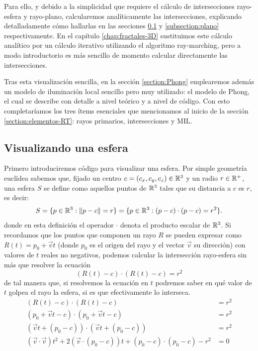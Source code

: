 Para ello, y debido a la simplicidad que requiere el cálculo de intersecciones rayo-esfera y rayo-plano, calcularemos analíticamente las intersecciones, explicando detalladamente cómo hallarlas en las secciones \ref{subsection:esfera} y \ref{subsection:plano} respectivamente. En el capítulo \ref{chap:fractales-3D} sustituimos este cálculo analítico por un cálculo iterativo utilizando el algoritmo ray-marching, pero a modo introductorio es más sencillo de momento calcular directamente las intersecciones.

Tras esta visualización sencilla, en la sección \ref{section:Phong} emplearemos además un modelo de iluminación local sencillo pero muy utilizado: el modelo de Phong, el cual se describe con detalle a nivel teórico y a nivel de código. Con esto completaríamos los tres ítems esenciales que mencionamos al inicio de la sección \ref{section:elementos-RT}: rayos primarios, intersecciones y MIL.

\subsection{Visualizando una esfera}
\label{subsection:esfera}

Primero introduciremos código para visualizar una esfera. Por simple geometría euclídea sabemos que, fijado un centro $c=(c_x,c_y,c_z)\in\mathbb{R}^3$ y un radio $r\in\mathbb{R}^+$, una esfera $S$ se define como aquellos puntos de $\mathbb{R}^3$ tales que su distancia a $c$ es $r$, es decir:
$$
S = \{p\in\mathbb{R}^3:\|p-c\|=r\} = \{p\in\mathbb{R}^3:(p-c)\cdot (p-c)=r^2\}. 
$$
donde en esta definición el operador $\cdot$ denota el producto escalar de $\mathbb{R}^3$. Si recordamos que los puntos que componen un rayo $R$ se pueden expresar como $R(t)= p_0 + \vec vt$ (donde $p_0$ es el origen del rayo y el vector $\vec v$ su dirección) con valores de $t$ reales no negativos, podemos calcular la intersección rayo-esfera sin más que resolver la ecuación
$$
(R(t)-c)\cdot(R(t)-c)=r^2
$$
de tal manera que, si resolvemos la ecuación en $t$ podremos saber en qué valor de $t$ golpea el rayo la esfera, si es que efectivamente lo interseca.
\begin{equation}
    \label{eq:rayo-recta}
    \begin{split}
        (R(t)-c)\cdot(R(t)-c)&=r^2 \\
        (p_0 + \vec vt - c)\cdot(p_0 + \vec vt - c) &= r^2 \\
        (\vec vt + (p_0 -c))\cdot (\vec vt + (p_0 -c))&= r^2 \\
        (\vec v\cdot \vec v)t^2 + 2(\vec v\cdot(p_0-c))t + (p_0 -c)\cdot (p_0 -c) - r^2 &= 0 
    \end{split}
\end{equation}

